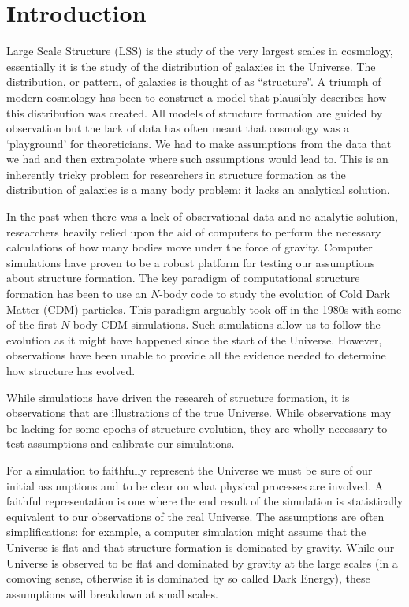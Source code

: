 %
\chapter{Introduction} %
\label{ch_1}

Large Scale Structure (LSS) is the study of the very largest scales in cosmology, essentially it is the study of the distribution of galaxies in 
the Universe. The distribution, or pattern, of galaxies is thought of as ``structure''. A triumph of modern cosmology has been to construct a model that plausibly describes how this distribution was created. All models of structure formation are guided by observation but the lack of data has often meant that cosmology was a `playground' for theoreticians. We had to make assumptions from the data that we had and then extrapolate where such assumptions would lead to. This is an inherently tricky problem for researchers in structure formation as the distribution of galaxies is a many body problem; it lacks an analytical solution. \citep{bib_pea, bib_bert}

In the past when there was a lack of observational data and no analytic solution, researchers heavily relied upon the aid of computers to perform the necessary calculations of how many bodies move under the force of gravity. Computer simulations have proven to be a robust platform for testing our assumptions about structure formation. The key paradigm of computational structure formation has been to use an $N$-body code to study the evolution of Cold Dark Matter (CDM) particles. This paradigm arguably took off in the 1980s with some of the first $N$-body CDM simulations. Such simulations allow us to follow the evolution as it might have happened since the start of the Universe. However, observations have been unable to provide all the evidence needed to determine how structure has evolved.

While simulations have driven the research of structure formation, it is observations that are illustrations of the true Universe. While observations may be lacking for some epochs of structure evolution, they are wholly necessary to test assumptions and calibrate our simulations.

For a simulation to faithfully represent the Universe we must be sure of our initial assumptions and to be clear on what physical processes are involved. A faithful representation is one where the end result of the simulation is statistically equivalent to our observations of the real Universe. The assumptions are often simplifications: for example, a computer simulation might assume that the Universe is flat and that structure formation is dominated by gravity. While our Universe is observed to be flat and dominated by gravity at the large scales (in a comoving sense, otherwise it is dominated by so called Dark Energy), these assumptions will breakdown at small scales.

